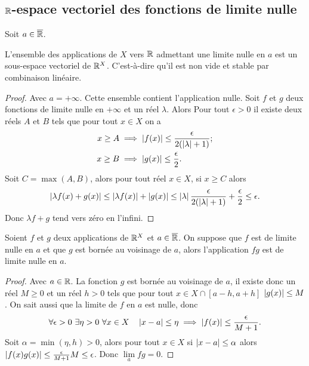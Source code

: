 \subsection{$\mathbb{R}$-espace vectoriel des fonctions de limite nulle}
Soit $a \in \overline{\mathbb{R}}$.
\begin{theo}
  L'ensemble des applications de $X$ vers $\mathbb{R}$ admettant une limite nulle en $a$ est un sous-espace vectoriel de $\mathbb{R}^X$. C'est-à-dire qu'il est non vide et stable par combinaison linéaire.
\end{theo}
\begin{proof}
  Avec $a=+\infty$. Cette ensemble contient l'application nulle. Soit $f$ et $g$ deux fonctions de limite nulle en $+\infty$ et un réel $\lambda$. Alors Pour tout $\epsilon >0$ il existe deux réels $A$ et $B$ tels que pour tout $x \in X$ on a
  \begin{align}
    x \geq A &\implies \left\lvert f(x)\right\rvert \leq \frac{\epsilon}{2(\left\lvert\lambda\right\rvert+1)}; \\
    x \geq B &\implies \left\lvert g(x)\right\rvert \leq \frac{\epsilon}{2}.
  \end{align}
  Soit $C=\max(A,B)$, alors pour tout réel $x \in X$, si $x \geq C$ alors 
  \begin{equation}
    \left\lvert\lambda f(x)+g(x)\right\rvert \leq \left\lvert\lambda f(x)\right\rvert+\left\lvert g(x)\right\rvert\leq \left\lvert\lambda\right\rvert\frac{\epsilon}{2(\left\lvert\lambda\right\rvert+1)} + \frac{\epsilon}{2} \leq \epsilon.
  \end{equation}
  Donc $\lambda f+g$ tend vers zéro en l'infini.
\end{proof}
\begin{prop}
  Soient $f$ et $g$ deux applications de $\mathbb{R}^X$ et $a \in \overline{\mathbb{R}}$. On suppose que $f$ est de limite nulle en $a$ et que $g$ est bornée au voisinage de $a$, alors l'application $fg$ est de limite nulle en $a$. 
\end{prop}
\begin{proof}
  Avec $a \in \mathbb{R}$. La fonction $g$ est bornée au voisinage de $a$, il existe donc un réel $M \geq 0$ et un réel $h > 0$ tels que pour tout $x \in X \cap [a-h,a+h]$ $\left\lvert g(x)\right\rvert \leq M$. On sait aussi que la limite de $f$ en $a$ est nulle, donc
  \begin{equation}
    \forall \epsilon > 0 \ \exists \eta > 0 \ \forall x \in X \quad \abs{x-a} \leq \eta \implies \abs{f(x)} \leq \frac{\epsilon}{M+1}.
  \end{equation}
  Soit $\alpha = \min(\eta, h) >0$, alors pour tout $x \in X$ si $\left\lvert x-a\right\rvert\leq \alpha$ alors $\left\lvert f(x)g(x)\right\rvert \leq \frac{\epsilon}{M+1}M \leq \epsilon$. Donc $\lim\limits_{a} fg=0$.
\end{proof}

